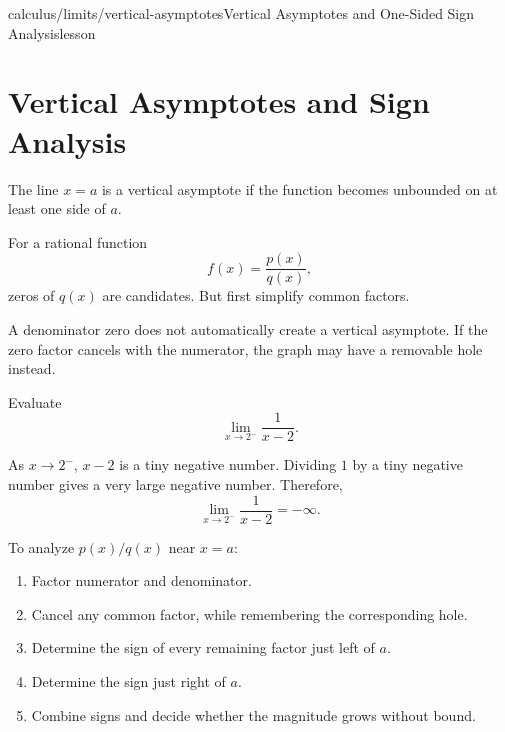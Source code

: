 \begin{webpage}{calculus/limits/vertical-asymptotes}{Vertical Asymptotes and One-Sided Sign Analysis}{lesson}
\section{Vertical Asymptotes and Sign Analysis}


The line \(x=a\) is a vertical asymptote if the function becomes unbounded on at least one side of \(a\).

For a rational function
\[
  f(x)=\frac{p(x)}{q(x)},
\]
zeros of \(q(x)\) are candidates. But first simplify common factors.

\begin{bgmistake}
A denominator zero does not automatically create a vertical asymptote. If the zero factor cancels with the numerator, the graph may have a removable hole instead.
\end{bgmistake}

\begin{bgguided}[title={Identify the sign before saying infinity}]
Evaluate
\[
  \lim_{x\to2^-}\frac1{x-2}.
\]

\begin{bgsolution}
As \(x\to2^-\), \(x-2\) is a tiny negative number. Dividing \(1\) by a tiny negative number gives a very large negative number. Therefore,
\[
  \boxed{\lim_{x\to2^-}\frac1{x-2}=-\infty}.
\]
\end{bgsolution}
\end{bgguided}



\begin{bgmethod}[title={One-Sided Sign Chart}]
To analyze \(p(x)/q(x)\) near \(x=a\):
\begin{enumerate}
  \item Factor numerator and denominator.
  \item Cancel any common factor, while remembering the corresponding hole.
  \item Determine the sign of every remaining factor just left of \(a\).
  \item Determine the sign just right of \(a\).
  \item Combine signs and decide whether the magnitude grows without bound.
\end{enumerate}
\end{bgmethod}


\end{webpage}
